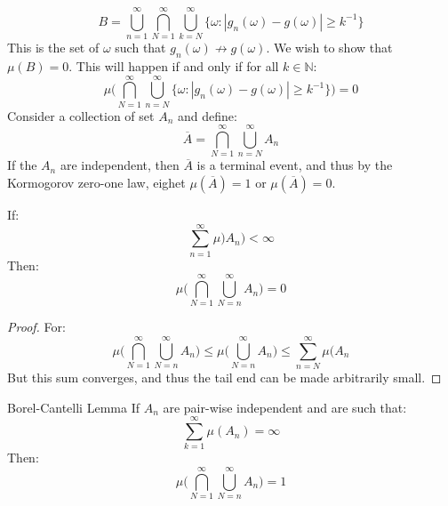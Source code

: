     \begin{equation}
        B=\bigcup_{n=1}^{\infty}\bigcap_{N=1}^{\infty}
            \bigcup_{k=N}^{\infty}\big\{\omega:
            |g_{n}(\omega)-g(\omega)|\geq{k}^{\minus{1}}\big\}
    \end{equation}
    This is the set of $\omega$ such that
    $g_{n}(\omega)\not\rightarrow{g}(\omega)$. We wish to show
    that $\mu(B)=0$. This will happen if and only if for all
    $k\in\mathbb{N}$:
    \begin{equation}
        \mu\Big(\bigcap_{N=1}^{\infty}\bigcup_{n=N}^{\infty}
            \big\{\omega:|g_{n}(\omega)-g(\omega)|
            \geq{k}^{\minus{1}}\big\}\Big)=0
    \end{equation}
    Consider a collection of set $A_{n}$ and define:
    \begin{equation}
        \overline{A}=\bigcap_{N=1}^{\infty}
            \bigcup_{n=N}^{\infty}A_{n}
    \end{equation}
    If the $A_{n}$ are independent, then $\overline{A}$ is
    a terminal event, and thus by the Kormogorov zero-one law,
    eighet $\mu(\overline{A})=1$ or $\mu(\overline{A})=0$.
    \begin{theorem}
        If:
        \begin{equation}
            \sum_{n=1}^{\infty}\mu)A_{n})<\infty
        \end{equation}
        Then:
        \begin{equation}
            \mu\Big(\bigcap_{N=1}^{\infty}
                \bigcup_{N=n}^{\infty}A_{n}\Big)=0
        \end{equation}
    \end{theorem}
    \begin{proof}
        For:
        \begin{equation}
            \mu\Big(\bigcap_{N=1}^{\infty}
                \bigcup_{N=n}^{\infty}A_{n}\Big)
            \leq\mu\Big(\bigcup_{N=n}^{\infty}A_{n}\Big)
            \leq\sum_{n=N}^{\infty}\mu(A_{n}
        \end{equation}
        But this sum converges, and thus the tail end can
        be made arbitrarily small.
    \end{proof}
    \begin{ltheorem}{Borel-Cantelli Lemma}
        If $A_{n}$ are pair-wise independent and are such
        that:
        \begin{equation}
            \sum_{k=1}^{\infty}\mu(A_{n})=\infty
        \end{equation}
        Then:
        \begin{equation}
            \mu\Big(\bigcap_{N=1}^{\infty}
                \bigcup_{N=n}^{\infty}A_{n}\Big)=1
        \end{equation}
    \end{ltheorem}
